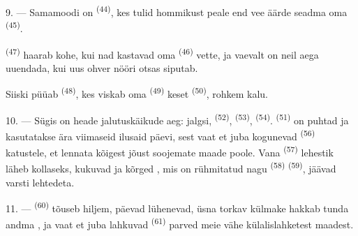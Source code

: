 \VUsaut{5.0mm}
\VUsaut{3.4mm}

9. --- Samamoodi on  \textsuperscript{(44)}, kes tulid hommikust
peale end vee äärde seadma oma  \textsuperscript{(45)}.

 \textsuperscript{(47)} haarab  kohe, kui nad kastavad
oma  \textsuperscript{(46)} vette, ja vaevalt on neil aega 
uuendada, kui uus ohver nööri otsas siputab.

Siiski püüab  \textsuperscript{(48)}, kes viskab oma
 \textsuperscript{(49)}  keset 
\textsuperscript{(50)}, rohkem kalu.

10. --- Sügis on heade jalutuskäikude aeg: jalgsi, 
\textsuperscript{(52)},  \textsuperscript{(53)}, 
\textsuperscript{(54)}.  \textsuperscript{(51)} on puhtad ja kasutatakse ära
viimaseid ilusaid päevi, sest vaat et juba kogunevad 
\textsuperscript{(56)} katustele, et lennata kõigest jõust soojemate maade poole. Vana
 \textsuperscript{(57)} lehestik läheb kollaseks, 
kukuvad ja kõrged , mis on rühmitatud nagu 
\textsuperscript{(58)}  \textsuperscript{(59)}, jäävad varsti
lehtedeta.

11. ---  \textsuperscript{(60)} tõuseb hiljem, päevad lühenevad, üsna
torkav külmake hakkab tunda andma , ja vaat et juba lahkuvad
 \textsuperscript{(61)} parved meie vähe külalislahketest
maadest.

\VUsaut{6.0mm}
\VUfilet{22mm}
